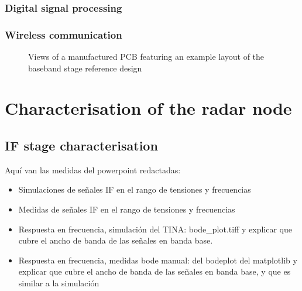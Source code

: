 \subsection{Digital signal processing}
\subsection{Wireless communication}

\begin{figure}[ht]
	\centering
	\caption{Views of a manufactured PCB featuring an example layout of the baseband stage reference design \label{fig:bb_board}}
\end{figure}

\chapter{Characterisation of the radar node}
\section{IF stage characterisation}
Aquí van las medidas del powerpoint redactadas:
\begin{itemize}
	\item Simulaciones de señales IF en el rango de tensiones y frecuencias
	\item Medidas de señales IF en el rango de tensiones y frecuencias
	\item Respuesta en frecuencia, simulación del TINA: bode\_plot.tiff y explicar que cubre el ancho de banda de las señales en banda base.
	\item Respuesta en frecuencia, medidas bode manual: del bodeplot del matplotlib y explicar que cubre el ancho de banda de las señales en banda base, y que es similar a la simulación
\end{itemize}

